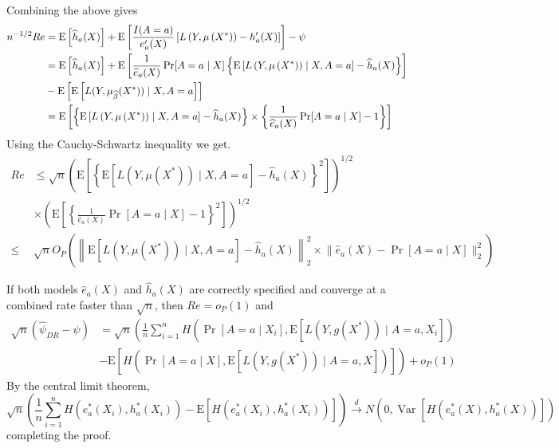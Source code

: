Combining the above gives
$$
\begin{aligned}
n^{-1 / 2} R e & =\mathrm{E}\left[\widehat{h}_a(X)\right]+\mathrm{E}\left[\frac{I(A = a)}{e_a^{\prime}(X)}\left[L\left(Y, \mu\left(X^*\right)\right)-h_a^{\prime}(X)\right]\right]-\psi \\
& =\mathrm{E}\left[\widehat{h}_a(X)\right]+\mathrm{E}\left[\frac{1}{\widehat{e}_a(X)} \operatorname{Pr}[A=a \mid X]\left\{\mathrm{E}\left[L\left(Y, \mu\left(X^*\right)\right) \mid X, A=a\right]-\widehat{h}_a(X)\right\}\right] \\ 
&- \operatorname{E}\left[\operatorname{E}\left[L(Y, \mu_{\widehat{\beta}}(X^*))\mid X, A = a\right]\right]\\
& =\operatorname{E}\left[\left\{\mathrm{E}\left[L\left(Y, \mu\left(X^*\right)\right) \mid X, A=a\right]-\widehat{h}_a(X)\right\}\times\left\{\frac{1}{\widehat{e}_a(X)} \operatorname{Pr}[A=a \mid X]-1\right\}\right]
\end{aligned}
$$
Using the Cauchy-Schwartz inequality we get.
$$
\begin{aligned}
Re & \leq \sqrt{n}\left(\mathrm{E}\left[\left\{\mathrm{E}\left[L\left(Y, \mu\left(X^*\right)\right) \mid X, A=a\right]-\widehat{h}_a(X)\right\}^2\right]\right)^{1 / 2} \\
& \times\left(\mathrm{E}\left[\left\{\frac{1}{\widehat{e}_a(X)} \operatorname{Pr}[A=a \mid X]-1\right\}^2\right]\right)^{1 / 2} \\
\leq & \sqrt{n} O_P\left(\left\|\mathrm{E}\left[L\left(Y, \mu\left(X^*\right)\right) \mid X, A=a\right]-\widehat{h}_a(X)\right\|_2^2 \times\Big\|\widehat{e}_a(X)-\operatorname{Pr}[A=a \mid X]\Big\|_2^2\right)
\end{aligned}
$$

If both models $\widehat{e}_a(X)$ and $\widehat{h}_a(X)$ are correctly specified and converge at a combined rate faster than $\sqrt{n}$, then $R e=o_P(1)$ and
$$
\begin{aligned}
\sqrt{n}\left(\widehat{\psi}_{D R}-\psi\right) & =\sqrt{n}\left(\frac{1}{n} \sum_{i=1}^n H\left(\operatorname{Pr}\left[A=a \mid X_i\right], \mathrm{E}\left[L\left(Y, g\left(X^*\right)\right) \mid A=a, X_i\right]\right)\right. \\
& \left.-\mathrm{E}\left[H\left(\operatorname{Pr}[A=a \mid X], \mathrm{E}\left[L\left(Y, g\left(X^*\right)\right) \mid A=a, X\right]\right)\right]\right)+o_P(1)
\end{aligned}
$$
By the central limit theorem,
$$
\sqrt{n}\left(\frac{1}{n} \sum_{i=1}^n H\left(e^*_a(X_i), h^*_a(X_i)\right)-\mathrm{E}\left[H\left(e^*_a(X_i), h^*_a(X_i)\right)\right]\right) \stackrel{d}{\longrightarrow} N\left(0, \operatorname{Var}\left[H\left(e^*_a(X), h^*_a(X)\right)\right]\right)
$$
completing the proof.

